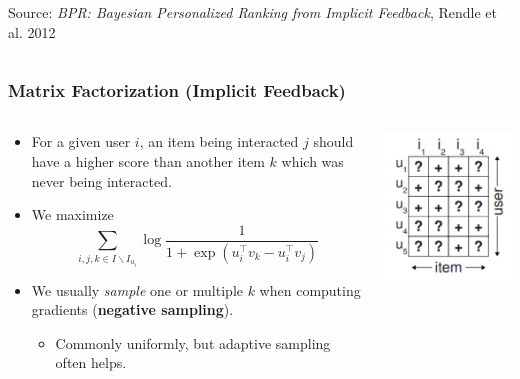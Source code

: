 \documentclass[11pt]{beamer}
\begin{document}
\begin{frame}
\begin{columns}
\begin{column}{0.5\textwidth}
\begin{center}
					{\tiny Source: \textit{BPR: Bayesian Personalized Ranking from Implicit Feedback}, Rendle et al. 2012}
				\end{center}
			\end{column}
		\end{columns}
	\end{frame}

	\begin{frame}
		\frametitle{Matrix Factorization (Implicit Feedback)}
		\begin{columns}
			\begin{column}{0.6\textwidth}
				\begin{itemize}
					\item<1-> For a given user $i$, an item being interacted $j$ should have a higher score than another item $k$ which was never being interacted.
					\item<2-> We maximize
					$$
					\sum_{i,j,k\in I \backslash I_{u_i}}
					\log \dfrac{1}{1 + \exp\left(u_i^\top v_k - u_i^\top v_j\right)}
					$$
					\item<3-> We usually \emph{sample} one or multiple $k$ when computing gradients (\textbf{negative sampling}).
					\begin{itemize}
						\item Commonly uniformly, but adaptive sampling often helps.
					\end{itemize}
				\end{itemize}
			\end{column}
			\begin{column}{0.4\textwidth}
				\begin{center}
					\centering
					\includegraphics[width=\textwidth]{images/implicit.png}
					

\end{center}
\end{column}
\end{columns}
\end{frame}
\end{document}
